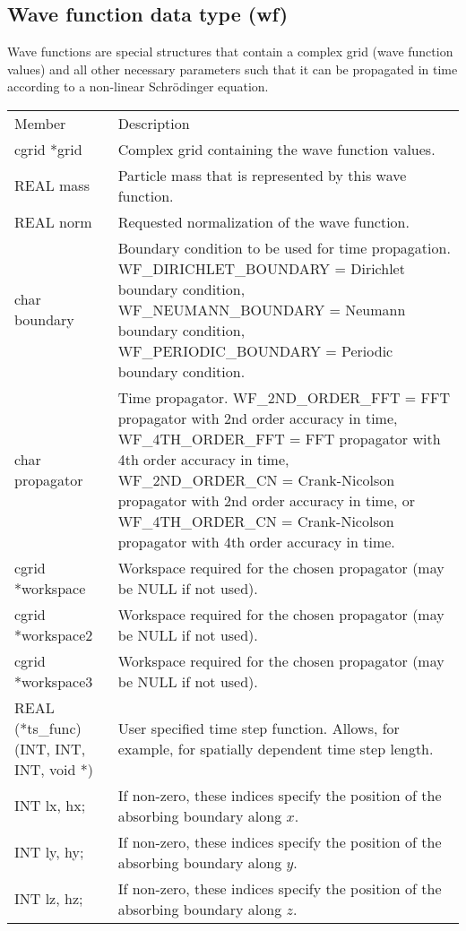 \documentclass[12pt,letterpaper]{report}
\begin{document}
\subsection{Wave function data type (wf)}

Wave functions are special structures that contain a complex grid (wave function values) and all other necessary parameters such that it can be propagated in time according to a non-linear Schr\"odinger equation.

\begin{longtable}{p{} p{}}
Member & Description\\
\cline{1-2}
cgrid *grid & Complex grid containing the wave function values.\\
REAL mass & Particle mass that is represented by this wave function.\\
REAL norm & Requested normalization of the wave function.\\
char boundary & Boundary condition to be used for time propagation. WF\_DIRICHLET\_BOUNDARY = Dirichlet boundary condition, WF\_NEUMANN\_BOUNDARY = Neumann boundary condition, WF\_PERIODIC\_BOUNDARY = Periodic boundary condition.\\
char propagator & Time propagator. WF\_2ND\_ORDER\_FFT = FFT propagator with 2nd order accuracy in time, WF\_4TH\_ORDER\_FFT = FFT propagator with 4th order accuracy in time, WF\_2ND\_ORDER\_CN = Crank-Nicolson propagator with 2nd order accuracy in time, or WF\_4TH\_ORDER\_CN = Crank-Nicolson propagator with 4th order accuracy in time.\\
cgrid *workspace & Workspace required for the chosen propagator (may be NULL if not used).\\
cgrid *workspace2 & Workspace required for the chosen propagator (may be NULL if not used).\\
cgrid *workspace3 & Workspace required for the chosen propagator (may be NULL if not used).\\
REAL (*ts\_func)(INT, INT, INT, void *) & User specified time step function. Allows, for example, for spatially dependent time step length.\\
INT lx, hx; & If non-zero, these indices specify the position of the absorbing boundary along $x$.\\
INT ly, hy; & If non-zero, these indices specify the position of the absorbing boundary along $y$.\\
INT lz, hz;  & If non-zero, these indices specify the position of the absorbing boundary along $z$.\\
\end{longtable}
\end{document}
